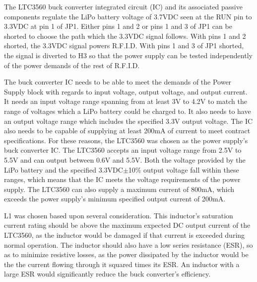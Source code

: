 The LTC3560 buck converter integrated circuit (IC) and its associated passive components regulate the LiPo battery voltage of 3.7VDC seen at the RUN pin to 3.3VDC at pin 1 of JP1. Either pins 1 and 2 or pins 1 and 3 of JP1 can be shorted to choose the path which the 3.3VDC signal follows. With pins 1 and 2 shorted, the 3.3VDC signal powers R.F.I.D. With pins 1 and 3 of JP1 shorted, the signal is diverted to H3 so that the power supply can be tested independently of the power demands of the rest of R.F.I.D. 

The buck converter IC needs to be able to meet the demands of the Power Supply block with regards to input voltage, output voltage, and output current. It needs an input voltage range spanning from at least 3V to 4.2V \DIFdelbegin {}\DIFdelend to match the range of voltages which a LiPo battery could be charged to. It also needs to have an output voltage range which includes the specified 3.3V output voltage. The IC also needs to be capable of supplying at least 200mA of current to meet contract specifications. For these reasons, the LTC3560 was \DIFdelbegin {}\DIFdelend chosen as the power supply's buck converter IC. The LTC3560 accepts an input voltage range from 2.5V to 5.5V and can output between 0.6V and 5.5V. Both the voltage provided by the LiPo battery and the specified 3.3VDC$\pm$10\% output voltage fall within these ranges, which means that the IC meets the voltage requirements of the power supply. The LTC3560 can also supply a maximum current of 800mA, which exceeds the power supply's minimum specified output current of 200mA.


\DIFaddbegin {}\DIFaddend L1 was chosen based upon several consideration. This inductor's saturation current rating should be above the maximum expected DC output current of the LTC3560, as the inductor would be damaged if that current is exceeded during normal operation. The inductor should also have a low \DIFdelbegin {}\DIFdelend \DIFaddbegin {}\DIFaddend series resistance (ESR), so as to minimize resistive losses, as the power dissipated by the inductor would be the the current flowing through it squared times its ESR. An inductor with a large ESR would significantly reduce the buck converter's efficiency.

